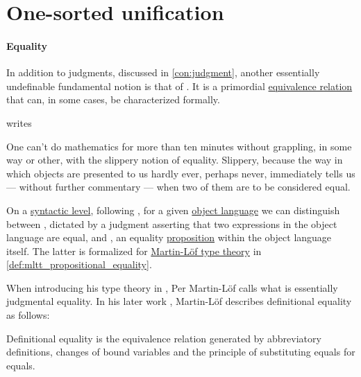 \section{One-sorted unification}\label{sec:one_sorted_unification}

\paragraph{Equality}

\begin{concept}\label{con:equality}
  In addition to judgments, discussed in \cref{con:judgment}, another essentially undefinable fundamental notion is that of . It is a primordial \hyperref[def:equivalence_relation]{equivalence relation} that can, in some cases, be characterized formally.

  \Textcite[222]{Mazur2008Equality} writes
  \begin{displayquote}
    One can't do mathematics for more than ten minutes without grappling, in some way or other, with the slippery notion of equality. Slippery, because the way in which objects are presented to us hardly ever, perhaps never, immediately tells us --- without further commentary --- when two of them are to be considered equal.
  \end{displayquote}

  On a \hyperref[con:syntax_semantics_duality]{syntactic level}, following \cite[19]{UnivalentFoundationsProgram2013HoTT}, for a given \hyperref[con:metalanguage]{object language} we can distinguish between , dictated by a judgment asserting that two expressions in the object language are equal, and , an equality \hyperref[con:proposition]{proposition} within the object language itself. The latter is formalized for \hyperref[def:martin_lof_type_theory]{Martin-L\"of type theory} in \cref{def:mltt_propositional_equality}.

  When introducing his type theory in \cite[85]{MartinLöf1984IntuitionisticTypeTheory}, Per Martin-L\"of calls  what is essentially judgmental equality. In his later work \cite[40]{MartinLöf1984IntuitionisticTypeTheory}, Martin-L\"of describes definitional equality as follows:
  \begin{displayquote}
    Definitional equality is the equivalence relation generated by abbreviatory definitions, changes of bound variables and the principle of substituting equals for equals.
  \end{displayquote}


\end{concept}
